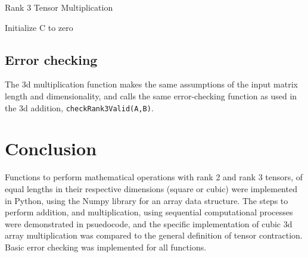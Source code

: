 \documentclass[10 pt, conference]{cssconf}
\begin{document}
\begin{algorithm}[ht] \small
\caption{Rank 3 Tensor Multiplication}\label{pc:rank3_mult}
    	 \SetAlgoLined
	Initialize C to zero\;
\end{algorithm}%

\subsection{Error checking}
The 3d multiplication function makes the same assumptions of the input matrix length and dimensionality, and calls the same error-checking function as used in the 3d addition, \verb|checkRank3Valid(A,B)|.
\addtolength{\textheight}{-11.0cm} 
\section{Conclusion}
Functions to perform mathematical operations with rank 2 and rank 3 tensors, of equal lengths in their respective dimensions (square or cubic) were implemented in Python, using the Numpy library for an array data structure. The steps to perform addition, and multiplication, using sequential computational processes were demonstrated in psuedocode, and the specific implementation of cubic 3d array multiplication was compared to the general definition of tensor contraction. Basic error checking was implemented for all functions.

\clearpage
\newpage
\onecolumn

{}


\end{document}
